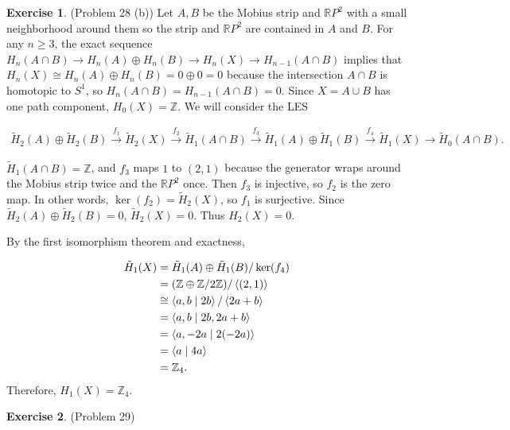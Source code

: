 \documentclass[psamsfonts]{amsart}
\theoremstyle{definition}
\newtheorem*{exer}{Exercise}
\theoremstyle{remark}
\numberwithin{equation}{section}
\begin{document}
\begin{exer}{(Problem 28 (b))}
  Let $A, B$ be the Mobius strip and $\mathbb{R}P^2$ with a small neighborhood around them so the strip and $\mathbb{R}P^2$ are contained in $A$ and $B$.
  For any $n \geq 3$, the exact sequence $H_n(A \cap B) \rightarrow H_n(A) \oplus H_n(B) \rightarrow H_n(X) \rightarrow H_{n - 1}(A \cap B)$ implies that $H_n(X) \cong H_n(A) \oplus H_n(B) = 0 \oplus 0 = 0$ because the intersection $A \cap B$ is homotopic to $S^1$, so $H_n(A \cap B) = H_{n - 1}(A \cap B) = 0$.
  Since $X = A \cup B$ has one path component, $H_0(X) = \mathbb{Z}$.
  We will consider the LES

  \begin{align*}
    \tilde{H}_2(A) \oplus \tilde{H}_2(B) \xrightarrow{f_1} \tilde{H}_2(X) 
    \xrightarrow{f_2} \tilde{H}_1(A \cap B) \xrightarrow{f_3} \tilde{H}_1(A) \oplus \tilde{H}_1(B) \xrightarrow{f_4} \tilde{H}_1(X) 
    \rightarrow \tilde{H}_0(A \cap B).
  \end{align*}

  $\tilde{H}_1(A \cap B) = \mathbb{Z}$, and $f_3$ maps $1$ to $(2, 1)$ because the generator wraps around the Mobius strip twice and the $\mathbb{R}P^2$ once.
  Then $f_3$ is injective, so $f_2$ is the zero map.
  In other words, $\ker(f_2) = \tilde{H}_2(X)$, so $f_1$ is surjective.
  Since $\tilde{H}_2(A) \oplus \tilde{H}_2(B) = 0$, $\tilde{H}_2(X) = 0$.
  Thus $H_2(X) = 0$.

  By the first isomorphism theorem and exactness,

  \begin{align*}
    \tilde{H}_1(X)
      &= \tilde{H}_1(A) \oplus \tilde{H}_1(B) / \ker(f_4) \\
      &= (\mathbb{Z} \oplus \mathbb{Z}/2\mathbb{Z}) / \ev{(2, 1)} \\
      &\cong \ev{a, b \mid 2b}  / \ev{2a + b} \\
      &= \ev{a, b \mid 2b, 2a + b} \\
      &= \ev{a, -2a \mid 2(-2a)} \\
      &= \ev{a \mid 4a} \\
      &= \mathbb{Z}_4.
  \end{align*}
  Therefore, $H_1(X) = \mathbb{Z}_4$.
\end{exer}

\begin{exer}{(Problem 29)}
  \todo[inline,caption={}]{
  }
\end{exer}
\end{document}
